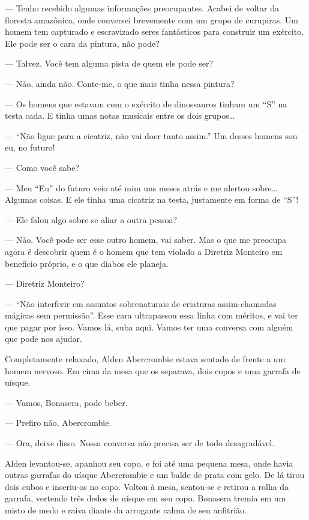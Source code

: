 --- Tenho recebido algumas informações preocupantes. Acabei de voltar da
floresta amazônica, onde conversei brevemente com um grupo de curupiras. Um
homem tem capturado e escravizado seres fantásticos para construir um exército.
Ele pode ser o cara da pintura, não pode?

--- Talvez. Você tem alguma pista de quem ele pode ser?

--- Não, ainda não. Conte-me, o que mais tinha nessa pintura?

--- Os homens que estavam com o exército de dinossauros tinham um “S” na testa
cada. E tinha umas notas musicais entre os dois grupos\ldots

--- “Não ligue para a cicatriz, não vai doer tanto assim.” Um desses homens sou
eu, no futuro!

--- Como você sabe?

--- Meu “Eu” do futuro veio até mim uns meses atrás e me alertou
sobre\ldots\,Algumas coisas. E ele tinha uma cicatriz na testa, justamente em
forma de “S”!

--- Ele falou algo sobre se aliar a outra pessoa?

--- Não. Você pode ser esse outro homem, vai saber. Mas o que me preocupa agora
é descobrir quem é o homem que tem violado a Diretriz Monteiro em benefício
próprio, e o que diabos ele planeja.

--- Diretriz Monteiro?

--- “Não interferir em assuntos sobrenaturais de criaturas assim-chamadas
mágicas sem permissão”. Esse cara ultrapassou essa linha com méritos, e vai ter
que pagar por isso. Vamos lá, suba aqui. Vamos ter uma conversa com alguém que
pode nos ajudar.


Completamente relaxado, Alden Abercrombie estava sentado de frente a um homem
nervoso. Em cima da mesa que os separava, dois copos e uma garrafa de uísque.

--- Vamos, Bonasera, pode beber.

--- Prefiro não, Abercrombie.

--- Ora, deixe disso. Nossa conversa não precisa ser de todo desagradável.

Alden levantou-se, apanhou seu copo, e foi até uma pequena mesa, onde havia
outras garrafas do uísque Abercrombie e um balde de prata com gelo. De lá tirou
dois cubos e inseriu-os no copo. Voltou à mesa, sentou-se e retirou a rolha da
garrafa, vertendo três dedos de uísque em seu copo. Bonasera tremia em um misto
de medo e raiva diante da arrogante calma de seu anfitrião.

